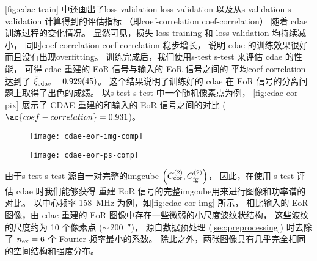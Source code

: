 \autoref{fig:cdae-train} 中还画出了\acl{loss-validation} \ac{loss-validation}
以及从\acl{s-validation} \ac{s-validation} 计算得到的评估指标
（即\acl{coef-correlation} \ac{coef-correlation}）
随着 \ac{cdae} 训练过程的变化情况。
显然可见，损失 \ac{loss-training} 和 \ac{loss-validation} 均持续减小，
同时\acl{coef-correlation} \ac{coef-correlation} 稳步增长，
说明 \ac{cdae} 的训练效果很好而且没有出现\ac{overfitting}。
训练完成后，我们使用\acl{s-test} \ac{s-test} 来评估 \ac{cdae} 的性能，
可得 \ac{cdae} 重建的 EoR 信号与输入的 EoR 信号之间的
平均\acl{coef-correlation}达到了
$\bar{\xi}_{\mathrm{cdae}} = \num{0.929 +- 0.045}$。
这个结果说明了训练好的 \ac{cdae} 在 EoR 信号的分离问题上取得了出色的成绩。
以\acl*{s-test} \ac*{s-test} 中一个随机像素点为例，
\autoref{fig:cdae-eor-pix} 展示了 CDAE 重建的和输入的 EoR 信号之间的对比
($\ac{coef-correlation} = 0.931$)。

\begin{figure}[htp]
  \centering
  \texttt{[image: cdae-eor-img-comp]}
  \label{fig:cdae-eor-img}
\end{figure}

\begin{figure}[htp]
  \centering
  \texttt{[image: cdae-eor-ps-comp]}
  \label{fig:cdae-eor-ps}
\end{figure}

由于\acl{s-test} \ac{s-test} 源自一对完整的\ac{imgcube}
$\left( C_{\mathrm{eor}}^{(2)}, C_{\mathrm{fg}}^{(2)} \right)$，
因此，在使用 \ac{s-test} 评估 \ac{cdae} 时我们能够获得
重建 EoR 信号的完整\ac{imgcube}用来进行图像和功率谱的对比。
以中心频率 \SI{158}{\MHz} 为例，如\autoref{fig:cdae-eor-img} 所示，
相比输入的 EoR 图像，由 \ac{cdae} 重建的 EoR 图像中存在一些微弱的小尺度波纹状结构，
这些波纹的尺度约为 10 个像素点 ($\sim$\,\SI{200}{\arcsecond})，
源自数据预处理 (\autoref{sec:preprocessing}) 时去除了 $n_{\mathrm{ex}} = 6$
个 Fourier 频率最小的系数。
除此之外，两张图像具有几乎完全相同的空间结构和强度分布。

